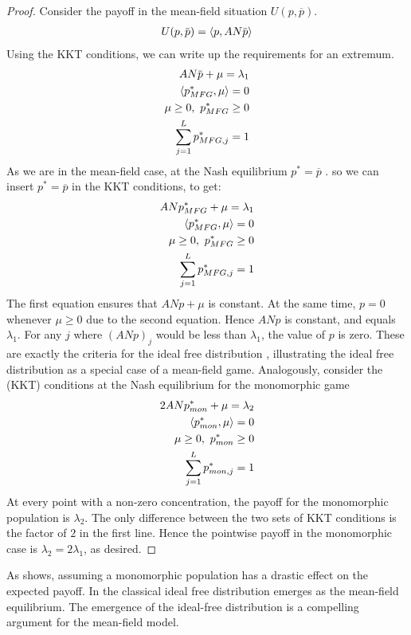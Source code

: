 \begin{proof}
Consider the payoff in the mean-field situation $U(p,\overbar{p})$.
\begin{align}
  U(p, \overbar{p}) = \ip{p}{AN \overbar{p}}
\end{align}
Using the KKT conditions, we can write up the requirements for an extremum.
\begin{equation}
  \begin{split}
    AN \overbar{p} + \mu = \lambda_1 \\
    \ip{p^*_{MFG}}{\mu} = 0 \\
    \mu \geq 0,~p^*_{MFG} \geq 0 \\
    \sum_{j=1}^L p^*_{MFG,j} = 1
  \end{split}
\end{equation}
As we are in the mean-field case, at the Nash equilibrium $p^* = \overbar{p}$ .
so we can insert $p^*=\overbar{p}$ in the KKT conditions, to get:
\begin{equation}
  \begin{split}
    AN p_{MFG}^* + \mu =  \lambda_1 \\
    \left \langle p^*_{MFG},\mu \right \rangle = 0 \\
    \mu \geq 0,~p^*_{MFG} \geq 0 \\
    \sum_{j=1}^L p^*_{MFG,j} = 1
  \end{split}
\end{equation}
The first equation ensures that $AN p + \mu$ is constant. At the same time, $p=0$ whenever $\mu \geq 0$ due to the second equation. Hence $AN p$ is constant, and equals $\lambda_1$. For any $j$ where $(ANp)_j$ would be less than $\lambda_1$, the value of $p$ is zero.
These are exactly the criteria for the ideal free distribution \citep{fretwell1969territorial}, illustrating the ideal free distribution as a special case of a mean-field game.
Analogously, consider the (KKT) conditions at the Nash equilibrium for the monomorphic game
\begin{equation}
  \begin{split}
    2ANp^*_{mon} + \mu = \lambda_2  \\
    \left \langle p^*_{mon},\mu \right \rangle = 0 \\
    \mu \geq 0,~p_{mon}^* \geq 0 \\
    \sum_{j=1}^L p^*_{mon,j} = 1
  \end{split}
\end{equation}
At every point with a non-zero concentration, the payoff for the monomorphic population is $\lambda_2$. The only difference between the two sets of KKT conditions is the factor of $2$ in the first line. Hence the pointwise payoff in the monomorphic case is $\lambda_2 = 2\lambda_1$, as desired.
\end{proof}

As  shows, assuming a monomorphic population has a drastic effect on the expected payoff. In  the classical ideal free distribution emerges as the mean-field equilibrium. The emergence of the ideal-free distribution is a compelling argument for the mean-field model.
